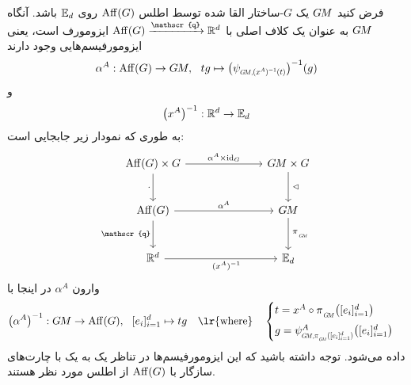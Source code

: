 \begin{thm}
	\label{thm:principal_bundle_isomorphism}
	فرض کنید $G\mkern-1.4muM$ یک $G$-ساختار القا شده توسط اطلس $\operatorname{Aff}(G)$ روی $\mathbb{E}_d$ باشد.
	آنگاه $G\mkern-1.4muM$ به عنوان یک کلاف اصلی با $\Aff(G) \xrightarrow{\mathscr{q}} \R^d$ ایزومورف است، یعنی ایزومورفیسم‌هایی وجود دارند
	\begin{align}\label{eq:principal_bundle_iso_AffG_GM}
		\alpha^A: \Aff(G) \to \GM,\ \ tg \mapsto \big( \psiGMxAinvt \big)^{-1}(g)
	\end{align}
	و
	\begin{align}
		\big( x^A \big)^{-1}: \mathbb{R}^d \to \mathbb{E}_d
	\end{align}
	به طوری که نمودار زیر جابجایی است:
	\begin{equation}\label{cd:GM_def_embedding}
		\begin{tikzcd}[row sep=2.5em, column sep=7.em]
			\Aff(G) \times G
			\arrow[r, "{\alpha^A \times \id_G}"]
			\arrow[d, "{\cdot}"']
			& \GM \times G
			\arrow[d, "{\,\lhd}"]
			\\
			\Aff(G)
			\arrow[r, pos=.5, "{\alpha^A}"]
			\arrow[d, "{\mathscr{q}}"']
			& \GM
			\arrow[d, "{\,\piGM}"]
			\\
			\R^d
			\arrow[r, pos=.55, "{(x^A)^{-1}}"']
			& \Euc_d
		\end{tikzcd}
	\end{equation}
	وارون $\alpha^A$ در اینجا با
	\begin{equation}
		\big(\alpha^A \big)^{-1}: \GM \to \Aff(G),\ \ [e_i]_{i=1}^d \mapsto tg
		\quad \textup{\lr{where}} \quad
		\begin{cases}
			t = x^A \circ \piGM \big( [e_i]_{i=1}^d \big) \\[1ex]
			g = \psi_{\protect\scalebox{.6}{$G\!M,$}\protect\scalebox{.7}{$\piGM([e_i]_{i=1}^d)$}}^A \big( [e_i]_{i=1}^d \big)
		\end{cases}
	\end{equation}
	داده می‌شود. توجه داشته باشید که این ایزومورفیسم‌ها در تناظر یک به یک با چارت‌های سازگار با $\operatorname{Aff}(G)$ از اطلس مورد نظر هستند.
\end{thm}

